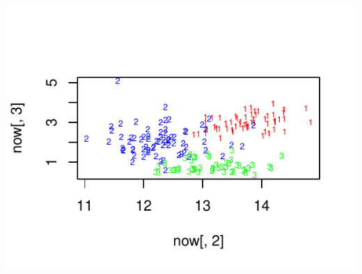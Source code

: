 \documentclass[10pt,a4paper]{article}\usepackage[]{graphicx}\usepackage[]{color}
\makeatletter
\def\maxwidth{ %
  \ifdim\Gin@nat@width>\linewidth
    \linewidth
  \else
    \Gin@nat@width
  \fi
}
\newenvironment{knitrout}{}{} %
\makeatother
\begin{document}
\begin{knitrout}
{\centering \includegraphics[width=\maxwidth]{figure/unnamed-chunk-5} 

}



\end{knitrout}
\end{document}
